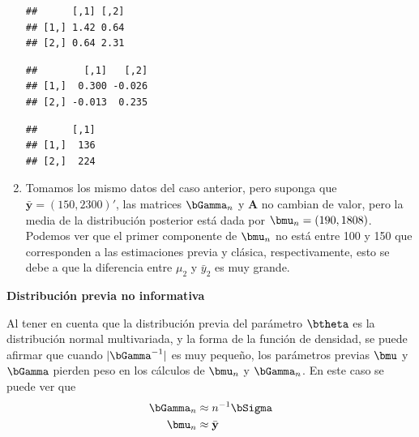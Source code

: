 \begin{enumerate}
\begin{knitrout}
\begin{kframe}
\begin{alltt}
\end{alltt}
\begin{verbatim}
##      [,1] [,2]
## [1,] 1.42 0.64
## [2,] 0.64 2.31
\end{verbatim}
\begin{alltt}
\end{alltt}
\begin{verbatim}
##        [,1]   [,2]
## [1,]  0.300 -0.026
## [2,] -0.013  0.235
\end{verbatim}
\begin{alltt}
\end{alltt}
\begin{verbatim}
##      [,1]
## [1,]  136
## [2,]  224
\end{verbatim}
\end{kframe}
\end{knitrout}
\item Tomamos los mismo datos del caso anterior, pero suponga que $\bar{\mathbf{y}}=(150,2300)'$, las matrices $\bGamma_n$ y $\mathbf{A}$ no cambian de valor, pero la media de la distribuci\'on posterior est\'a dada por $\bmu_n=(190,1808)$. Podemos ver que el primer componente de $\bmu_n$ no est\'a entre 100 y 150 que corresponden a las estimaciones previa y cl\'asica, respectivamente, esto se debe a que la diferencia entre $\mu_2$ y $\bar{y}_2$ es muy grande.
\begin{knitrout}
\color{fgcolor}
\end{knitrout}
\end{enumerate}

\textbf{Distribuci\'on previa no informativa}

Al tener en cuenta que la distribución previa del parámetro $\btheta$ es la distribución normal multivariada, y la forma de la función de densidad, se puede afirmar que cuando $|\bGamma^{-1}|$ es muy pequeño, los parámetros previas $\bmu$ y $\bGamma$ pierden peso en los cálculos de $\bmu_n$ y $\bGamma_n$. En este caso se puede ver que
\begin{align*}
\bGamma_n&\approx n^{-1}\bSigma\\
\bmu_n&\approx \bar{\mathbf{y}}
\end{align*}

